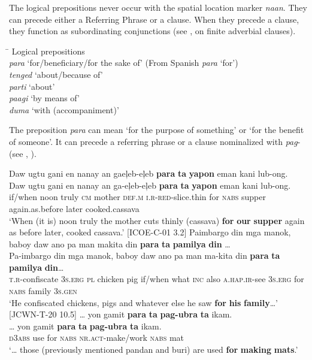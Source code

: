 The logical prepositions never occur with the spatial location marker \textit{naan}. They can precede either a Referring Phrase or a clause. When they precede a clause, they function as subordinating conjunctions (see ,  on finite adverbial clauses).

\ea
\begin{tabbing}
\hspace{2cm} \= \kill
Logical prepositions \\
\textit{para} \> ‘for/beneficiary/for the sake of’  (From Spanish \textit{para} ‘for’) \\
\textit{tenged} \> ‘about/because of’ \\
\textit{parti} \> ‘about’ \\
\textit{paagi} \> ‘by means of’ \\
\textit{duma} \> ‘with (accompaniment)’
\end{tabbing}
\z

The preposition \textit{para} can mean ‘for the purpose of something’ or ‘for the benefit of someone’. It can precede a referring phrase or a clause nominalized with \textit{pag}{}- (see , ).

\ea
Daw  ugtu  gani  en  nanay  an  gaeļeb-eļeb  \textbf{para}  \textbf{ta}  \textbf{yapon} eman  kani  lub-ong. \\\smallskip
 \gll Daw  ugtu  gani  en  nanay  an  ga-eļeb-eļeb  \textbf{para}  \textbf{ta}  \textbf{yapon} eman  kani  lub-ong. \\
if/when  noon  truly  \textsc{cm}  mother  \textsc{def.m}  \textsc{i.r}-\textsc{red}-slice.thin  for  \textsc{nabs}  supper
again.as.before  later  cooked.cassava \\
\glt `When (it is) noon truly the mother cuts thinly (cassava) \textbf{for} \textbf{our} \textbf{supper} again as before later, cooked cassava.’ [ICOE-C-01 3.2]
\z
\ea
Paimbargo  din  mga  manok,  baboy  daw  ano  pa  man makita  din  \textbf{para}  \textbf{ta}  \textbf{pamilya}  \textbf{din} … \\\smallskip
 \gll Pa-imbargo  din  mga  manok,  baboy  daw  ano  pa  man ma-kita  din  \textbf{para}  \textbf{ta}  \textbf{pamilya}  \textbf{din}… \\
\textsc{t.r}-confiscate  3\textsc{s.erg}  \textsc{pl}  chicken  pig  if/when  what  \textsc{inc}  also
\textsc{a.hap.ir}-see  3\textsc{s.erg}  for  \textsc{nabs}  family  3\textsc{s.gen} \\
\glt `He confiscated chickens, pigs and whatever  else he saw \textbf{for} \textbf{his} \textbf{family}…’ [JCWN-T-20 10.5]
\z
\ea
… yon  gamit  \textbf{para}  \textbf{ta}  \textbf{pag-ubra}   \textbf{ta}  ikam. \\\smallskip
 \gll … yon  gamit  \textbf{para}  \textbf{ta}  \textbf{pag-ubra}   \textbf{ta}  ikam. \\
{} \textsc{d}3\textsc{abs}  use  for  \textsc{nabs}  \textsc{nr.act}-make/work  \textsc{nabs}   mat \\
\glt ‘… those (previously mentioned pandan and buri) are used \textbf{for} \textbf{making} \textbf{mats}.’
\z


